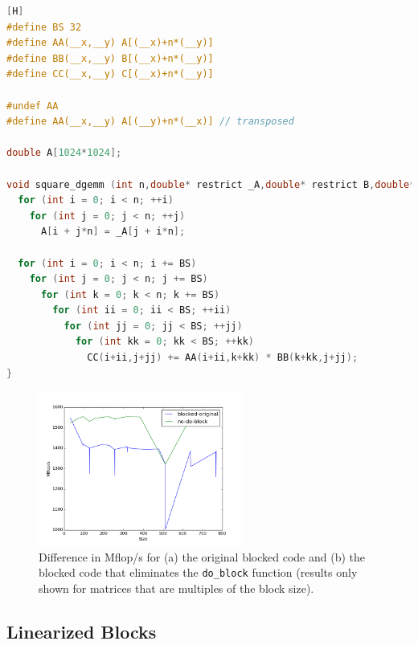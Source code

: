 \documentclass[10pt]{article}
\begin{document}
\begin{lstlisting}[language=C, basicstyle=\small][H]
#define BS 32
#define AA(__x,__y) A[(__x)+n*(__y)]
#define BB(__x,__y) B[(__x)+n*(__y)]
#define CC(__x,__y) C[(__x)+n*(__y)]

#undef AA
#define AA(__x,__y) A[(__y)+n*(__x)] // transposed

double A[1024*1024];

void square_dgemm (int n,double* restrict _A,double* restrict B,double* restrict C){
  for (int i = 0; i < n; ++i)
    for (int j = 0; j < n; ++j)
      A[i + j*n] = _A[j + i*n];

  for (int i = 0; i < n; i += BS)
    for (int j = 0; j < n; j += BS)
      for (int k = 0; k < n; k += BS)
        for (int ii = 0; ii < BS; ++ii)
          for (int jj = 0; jj < BS; ++jj)
            for (int kk = 0; kk < BS; ++kk)
              CC(i+ii,j+jj) += AA(i+ii,k+kk) * BB(k+kk,j+jj);
}
\end{lstlisting}

\begin{figure}[H]
\centering
\includegraphics[width=0.6\textwidth]{figures/no-do-block.png}
\caption{Difference in Mflop/s for (a) the original blocked code and (b) the blocked code that eliminates the {\tt do\_block} function (results only shown for matrices that are multiples of the block size).}
\label{fig:8}
\end{figure}

\subsection{Linearized Blocks}
\end{document}
